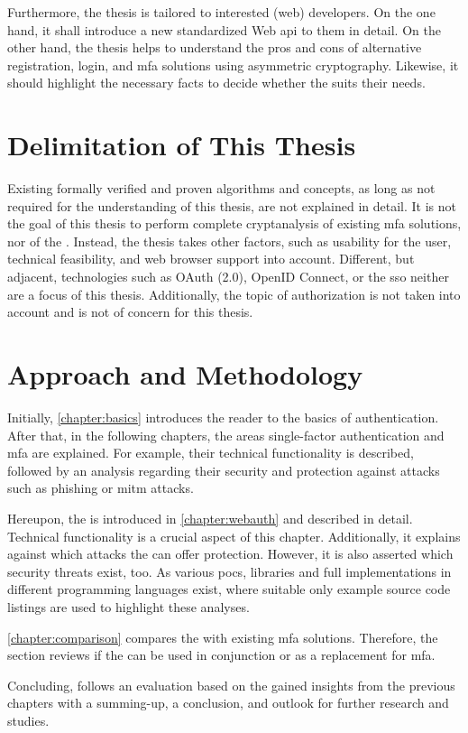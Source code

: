 Furthermore, the thesis is tailored to interested (web) developers. On the one hand, it shall introduce a new standardized Web \gls{api} to them in detail. On the other hand, the thesis helps to understand the pros and cons of alternative registration, login, and \gls{mfa} solutions using asymmetric cryptography. Likewise, it should highlight the necessary facts to decide whether the \wa{} suits their needs.

\section{Delimitation of This Thesis}

Existing formally verified and proven algorithms and concepts, as long as not required for the understanding of this thesis, are not explained in detail. It is not the goal of this thesis to perform complete cryptanalysis of existing \gls{mfa} solutions, nor of the \wa. Instead, the thesis takes other factors, such as usability for the user, technical feasibility, and web browser support into account. Different, but adjacent, technologies such as OAuth (2.0), OpenID Connect, or the \gls{sso} neither are a focus of this thesis. Additionally, the topic of authorization is not taken into account and is not of concern for this thesis. 

\section{Approach and Methodology}

Initially, \autoref{chapter:basics} introduces the reader to the basics of authentication. After that, in the following chapters, the areas single-factor authentication and \gls{mfa} are explained. For example, their technical functionality is described, followed by an analysis regarding their security and protection against attacks such as phishing or \gls{mitm} attacks.

Hereupon, the \wa{} is introduced in \autoref{chapter:webauth} and described in detail. Technical functionality is a crucial aspect of this chapter. Additionally, it explains against which attacks the \wa{} can offer protection. However, it is also asserted which security threats exist, too. As various \glspl{poc}, libraries and full implementations in different programming languages exist, where suitable only example source code listings are used to highlight these analyses.

\autoref{chapter:comparison} compares the \wa{} with existing \gls{mfa} solutions. Therefore, the section reviews if the \wa{} can be used in conjunction or as a replacement for \gls{mfa}.

Concluding, follows an evaluation based on the gained insights from the previous chapters with a summing-up, a conclusion, and outlook for further research and studies.
